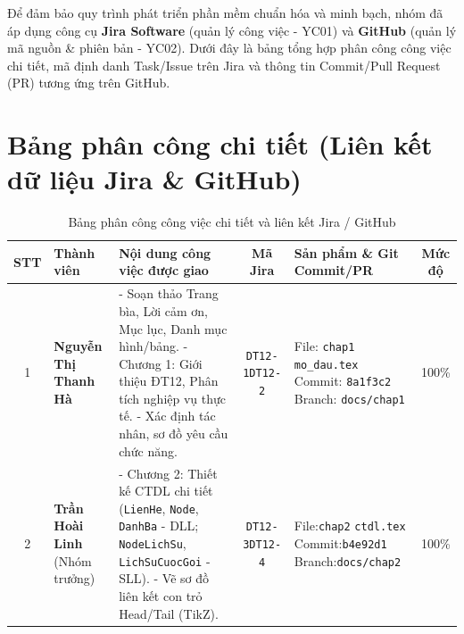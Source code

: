 \documentclass[12pt,a4paper]{report}
\begin{document}
Để đảm bảo quy trình phát triển phần mềm chuẩn hóa và minh bạch, nhóm đã áp dụng công cụ \textbf{Jira Software} (quản lý công việc - YC01) và \textbf{GitHub} (quản lý mã nguồn \& phiên bản - YC02). Dưới đây là bảng tổng hợp phân công công việc chi tiết, mã định danh Task/Issue trên Jira và thông tin Commit/Pull Request (PR) tương ứng trên GitHub.

\section*{Bảng phân công chi tiết (Liên kết dữ liệu Jira \& GitHub)}

\begin{table}[htbp]
\centering
\small
\caption{Bảng phân công công việc chi tiết và liên kết Jira / GitHub}
\label{tab:phan_cong_cong_viec}
\begin{tabularx}{\textwidth}{|c|>{\raggedright\arraybackslash}p{2.0cm}|X|c|>{\raggedright\arraybackslash}p{2.7cm}|c|}
\hline
\textbf{STT} & \textbf{Thành viên} & \textbf{Nội dung công việc được giao} & \textbf{Mã Jira} & \textbf{Sản phẩm \& Git Commit/PR} & \textbf{Mức độ} \\ \hline

1 & \textbf{Nguyễn Thị Thanh Hà} 
  & - Soạn thảo Trang bìa, Lời cảm ơn, Mục lục, Danh mục hình/bảng.\newline
    - Chương 1: Giới thiệu ĐT12, Phân tích nghiệp vụ thực tế.\newline
    - Xác định tác nhân, sơ đồ yêu cầu chức năng.
  & \texttt{DT12-1}\newline \texttt{DT12-2}
  & File: \texttt{\small chap1}\newline 
  \texttt{\small mo\_dau.tex}\newline 
  Commit: \newline \texttt{\small 8a1f3c2}\newline
  Branch: \newline \texttt{\small docs/chap1}
  & 100\% \\ \hline

2 & \textbf{Trần Hoài Linh} \newline (Nhóm trưởng) 
  & - Chương 2: Thiết kế CTDL chi tiết (\texttt{LienHe}, \texttt{Node}, \texttt{DanhBa} - DLL; \texttt{NodeLichSu}, \texttt{LichSuCuocGoi} - SLL).\newline
    - Vẽ sơ đồ liên kết con trỏ Head/Tail (TikZ).
  & \texttt{DT12-3}\newline \texttt{DT12-4}
  & File:\texttt{\small chap2}\newline
  \texttt{\small ctdl.tex}\newline
    Commit:\newline \texttt{\small b4e92d1}\newline
    Branch:\newline \texttt{\small docs/chap2}
  & 100\% \\ \hline


\end{tabularx}
\end{table}
\end{document}
